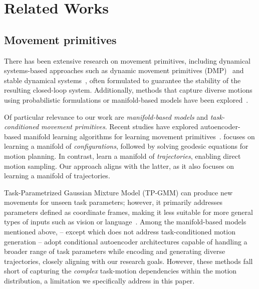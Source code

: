 \section{Related Works}
\label{sec:relatedworks}

\subsection{Movement primitives}
There has been extensive research on movement primitives, including dynamical systems-based approaches such as dynamic movement primitives (DMP)~\cite{saveriano2021dynamic, ijspeert2013dynamical, ijspeert2001trajectory, ijspeert2002learning2, schaal2007dynamics} and stable dynamical systems~\cite{khansari2011learning, neumann2013neural, khansari2014learning}, often formulated to guarantee the stability of the resulting closed-loop system. Additionally, methods that capture diverse motions using probabilistic formulations or manifold-based models have been explored~\cite{calinon2016tutorial, paraschos2013probabilistic, daab2024incremental, noseworthy2020task, lee2023equivariant, lee2024mmp++, beik2021learning}. 

Of particular relevance to our work are \emph{manifold-based models} and \emph{task-conditioned movement primitives}. Recent studies have explored autoencoder-based manifold learning algorithms for learning movement primitives~\cite{noseworthy2020task, beik2021learning, lee2023equivariant, lee2024mmp++}. \cite{beik2021learning} focuses on learning a manifold of {\it configurations}, followed by solving geodesic equations for motion planning. In contrast, \cite{noseworthy2020task, lee2023equivariant, lee2024mmp++} learn a manifold of {\it trajectories}, enabling direct motion sampling. Our approach aligns with the latter, as it also focuses on learning a manifold of trajectories.

Task-Parametrized Gaussian Mixture Model (TP-GMM) can produce new movements for unseen task parameters; however, it primarily addresses parameters defined as coordinate frames, making it less suitable for more general types of inputs such as vision or language~\cite{calinon2016tutorial}.  
Among the manifold-based models mentioned above, \cite{noseworthy2020task, lee2023equivariant} -- except \cite{lee2024mmp++} which does not address task-conditioned motion generation -- adopt conditional autoencoder architectures capable of handling a broader range of task parameters while encoding and generating diverse trajectories, closely aligning with our research goals. However, these methods fall short of capturing the {\it complex} task-motion dependencies within the motion distribution, a limitation we specifically address in this paper.



